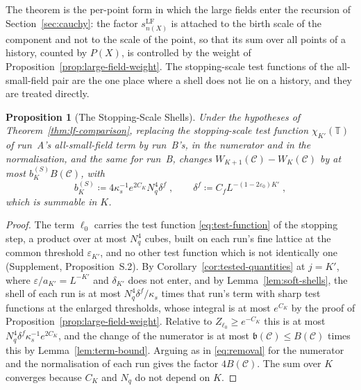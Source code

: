 \documentclass[11pt]{preprint}
\numberwithin{equation}{section}
\newtheorem{proposition}[theorem]{Proposition}
\theoremstyle{definition}
\theoremstyle{remark}
\theoremstyle{plain}
\begin{document}
The theorem is the per-point form in which the large fields enter the recursion of Section~\ref{sec:cauchy}: the factor $s^{\mathrm{LF}}_{n(X)}$ is attached to the birth scale of the component and not to the scale of the point, so that its sum over all points of a history, counted by $P(X)$, is controlled by the weight of Proposition~\ref{prop:large-field-weight}. The stopping-scale test functions of the all-small-field pair are the one place where a shell does not lie on a history, and they are treated directly.

\begin{proposition}[The Stopping-Scale Shells]\label{prop:stopping-shells}
Under the hypotheses of Theorem~\ref{thm:lf-comparison}, replacing the stopping-scale test function $\chi_{K'}(\mathbb T)$ of run~A's all-small-field term by run~B's, in the numerator and in the normalisation, and the same for run~B, changes $W_{K+1}(\mathcal C) - W_K(\mathcal C)$ by at most $b^{(S)}_KB(\mathcal C)$, with
\begin{equation}\label{eq:stopping-shells}
    b^{(S)}_K \coloneqq 4\kappa_s^{-1}e^{2C_K}N_q^4\delta^f\;,
    \qquad
    \delta^f \coloneqq C_fL^{-(1-2\varepsilon_0)K'}\;,
\end{equation}
which is summable in $K$.
\end{proposition}

\begin{proof}
The term $\ell_0$ carries the test function \eqref{eq:test-function} of the stopping step, a product over at most $N_q^4$ cubes, built on each run's fine lattice at the common threshold $\varepsilon_{K'}$, and no other test function which is not identically one (Supplement, Proposition~S.2). By Corollary~\ref{cor:tested-quantities} at $j = K'$, where $\varepsilon/a_{K'} = L^{-K'}$ and $\delta_{K'}$ does not enter, and by Lemma~\ref{lem:soft-shells}, the shell of each run is at most $N_q^4\delta^f/\kappa_s$ times that run's term with sharp test functions at the enlarged thresholds, whose integral is at most $e^{C_K}$ by the proof of Proposition~\ref{prop:large-field-weight}. Relative to $Z_{\ell_0} \geq e^{-C_K}$ this is at most $N_q^4\delta^f\kappa_s^{-1}e^{2C_K}$, and the change of the numerator is at most $\mathfrak b(\mathcal C) \leq B(\mathcal C)$ times this by Lemma~\ref{lem:term-bound}. Arguing as in \eqref{eq:removal} for the numerator and the normalisation of each run gives the factor $4B(\mathcal C)$. The sum over $K$ converges because $C_K$ and $N_q$ do not depend on $K$.
\end{proof}
\end{document}
